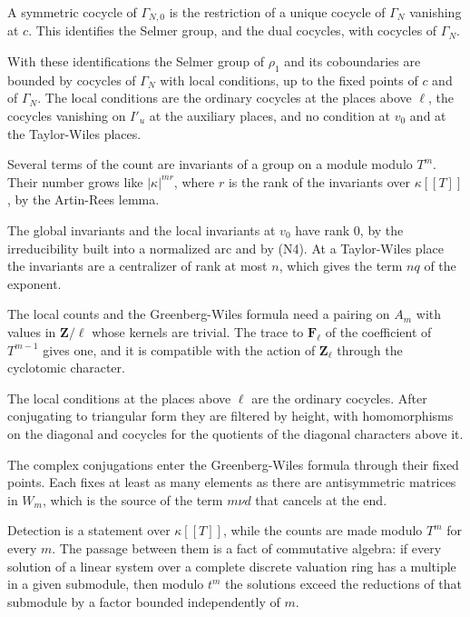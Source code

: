 A symmetric cocycle of $\Gamma_{N,0}$ is the restriction of a unique cocycle of $\Gamma_N$ vanishing at $c$. This identifies the Selmer group, and the dual cocycles, with cocycles of $\Gamma_N$.

With these identifications the Selmer group of $\rho_1$ and its coboundaries are bounded by cocycles of $\Gamma_N$ with local conditions, up to the fixed points of $c$ and of $\Gamma_N$. The local conditions are the ordinary cocycles at the places above $\ell$, the cocycles vanishing on $I'_u$ at the auxiliary places, and no condition at $v_0$ and at the Taylor-Wiles places.

Several terms of the count are invariants of a group on a module modulo $T^m$. Their number grows like $|\kappa|^{mr}$, where $r$ is the rank of the invariants over $\kappa[[T]]$, by the Artin-Rees lemma.

The global invariants and the local invariants at $v_0$ have rank $0$, by the irreducibility built into a normalized arc and by (N4). At a Taylor-Wiles place the invariants are a centralizer of rank at most $n$, which gives the term $nq$ of the exponent.

The local counts and the Greenberg-Wiles formula need a pairing on $A_m$ with values in $\mathbf Z/\ell$ whose kernels are trivial. The trace to $\mathbf F_\ell$ of the coefficient of $T^{m-1}$ gives one, and it is compatible with the action of $\mathbf Z_\ell$ through the cyclotomic character.

The local conditions at the places above $\ell$ are the ordinary cocycles. After conjugating to triangular form they are filtered by height, with homomorphisms on the diagonal and cocycles for the quotients of the diagonal characters above it.

The complex conjugations enter the Greenberg-Wiles formula through their fixed points. Each fixes at least as many elements as there are antisymmetric matrices in $W_m$, which is the source of the term $m\nu d$ that cancels at the end.

Detection is a statement over $\kappa[[T]]$, while the counts are made modulo $T^m$ for every $m$. The passage between them is a fact of commutative algebra: if every solution of a linear system over a complete discrete valuation ring has a multiple in a given submodule, then modulo $t^m$ the solutions exceed the reductions of that submodule by a factor bounded independently of $m$.

